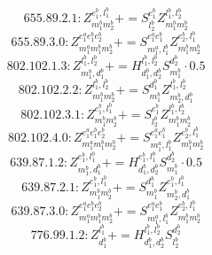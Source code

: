 \documentclass[letterpaper,10pt,fleqn,leqno,onecolumn]{article}
\begin{document}
\begin{equation} \;\;\;\;\;\;  655.89.2.1: Z^{e_{1}^{b},l_{1}^{b}}_{m_{1}^{b}m_{2}^{b}}+=S^{e_{1}^{b}}_{l_{2}^{b}}Z^{l_{1}^{b},l_{2}^{b}}_{m_{1}^{b}m_{2}^{b}} \end{equation}
\begin{equation} \;\;\;\;\;\;  655.89.3.0: Z^{e_{1}^{a}e_{1}^{b}e_{2}^{b}}_{m_{1}^{a}m_{1}^{b}m_{2}^{b}}+=S^{e_{1}^{a}e_{1}^{b}}_{m_{1}^{a},l_{1}^{b}}Z^{e_{2}^{b},l_{1}^{b}}_{m_{1}^{b}m_{2}^{b}} \end{equation}
\begin{equation} \;\;\;\;\;\;  802.102.1.3: Z^{l_{1}^{b},l_{2}^{b}}_{m_{1}^{b},d_{1}^{b}}+=H^{l_{1}^{b},l_{2}^{b}}_{d_{1}^{b},d_{2}^{b}}S^{d_{2}^{b}}_{m_{1}^{b}}\cdot 0.5 \end{equation}
\begin{equation} \;\;\;\;\;\;  802.102.2.2: Z^{l_{1}^{b},l_{2}^{b}}_{m_{1}^{b}m_{2}^{b}}+=S^{d_{1}^{b}}_{m_{1}^{b}}Z^{l_{1}^{b},l_{2}^{b}}_{m_{2}^{b},d_{1}^{b}} \end{equation}
\begin{equation} \;\;\;\;\;\;  802.102.3.1: Z^{e_{1}^{b},l_{1}^{b}}_{m_{1}^{b}m_{2}^{b}}+=S^{e_{1}^{b}}_{l_{2}^{b}}Z^{l_{1}^{b},l_{2}^{b}}_{m_{1}^{b}m_{2}^{b}} \end{equation}
\begin{equation} \;\;\;\;\;\;  802.102.4.0: Z^{e_{1}^{a}e_{1}^{b}e_{2}^{b}}_{m_{1}^{a}m_{1}^{b}m_{2}^{b}}+=S^{e_{1}^{a}e_{1}^{b}}_{m_{1}^{a},l_{1}^{b}}Z^{e_{2}^{b},l_{1}^{b}}_{m_{1}^{b}m_{2}^{b}} \end{equation}
\begin{equation} \;\;\;\;\;\;  639.87.1.2: Z^{e_{1}^{b},l_{1}^{b}}_{m_{1}^{b},d_{1}^{b}}+=H^{e_{1}^{b},l_{1}^{b}}_{d_{1}^{b},d_{2}^{b}}S^{d_{2}^{b}}_{m_{1}^{b}}\cdot 0.5 \end{equation}
\begin{equation} \;\;\;\;\;\;  639.87.2.1: Z^{e_{1}^{b},l_{1}^{b}}_{m_{1}^{b}m_{2}^{b}}+=S^{d_{1}^{b}}_{m_{1}^{b}}Z^{e_{1}^{b},l_{1}^{b}}_{m_{2}^{b},d_{1}^{b}} \end{equation}
\begin{equation} \;\;\;\;\;\;  639.87.3.0: Z^{e_{1}^{a}e_{1}^{b}e_{2}^{b}}_{m_{1}^{a}m_{1}^{b}m_{2}^{b}}+=S^{e_{1}^{a}e_{1}^{b}}_{m_{1}^{a},l_{1}^{b}}Z^{e_{2}^{b},l_{1}^{b}}_{m_{1}^{b}m_{2}^{b}} \end{equation}
\begin{equation} \;\;\;\;\;\;  776.99.1.2: Z^{l_{1}^{b}}_{d_{1}^{b}}+=H^{l_{1}^{b},l_{2}^{b}}_{d_{1}^{b},d_{2}^{b}}S^{d_{2}^{b}}_{l_{2}^{b}} \end{equation}
\end{document}
